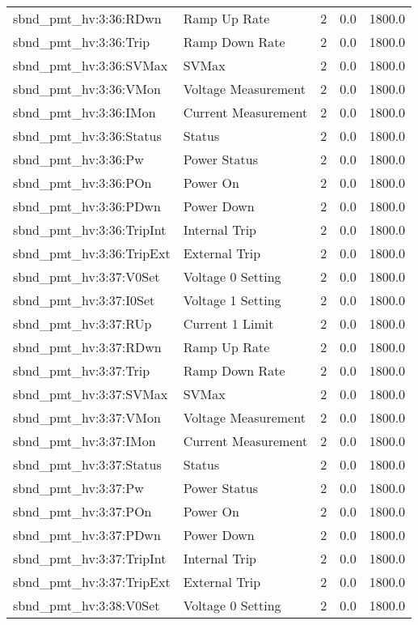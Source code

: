\begin{center}
\begin{longtable}{l | l l l l }
sbnd\_pmt\_hv:3:36:RDwn & Ramp Up Rate & 2 & 0.0 & 1800.0\\ 
sbnd\_pmt\_hv:3:36:Trip & Ramp Down Rate & 2 & 0.0 & 1800.0\\ 
sbnd\_pmt\_hv:3:36:SVMax & SVMax & 2 & 0.0 & 1800.0\\ 
sbnd\_pmt\_hv:3:36:VMon & Voltage Measurement & 2 & 0.0 & 1800.0\\ 
sbnd\_pmt\_hv:3:36:IMon & Current Measurement & 2 & 0.0 & 1800.0\\ 
sbnd\_pmt\_hv:3:36:Status & Status & 2 & 0.0 & 1800.0\\ 
sbnd\_pmt\_hv:3:36:Pw & Power Status & 2 & 0.0 & 1800.0\\ 
sbnd\_pmt\_hv:3:36:POn & Power On & 2 & 0.0 & 1800.0\\ 
sbnd\_pmt\_hv:3:36:PDwn & Power Down & 2 & 0.0 & 1800.0\\ 
sbnd\_pmt\_hv:3:36:TripInt & Internal Trip & 2 & 0.0 & 1800.0\\ 
sbnd\_pmt\_hv:3:36:TripExt & External Trip & 2 & 0.0 & 1800.0\\ 
sbnd\_pmt\_hv:3:37:V0Set & Voltage 0 Setting & 2 & 0.0 & 1800.0\\ 
sbnd\_pmt\_hv:3:37:I0Set & Voltage 1 Setting & 2 & 0.0 & 1800.0\\ 
sbnd\_pmt\_hv:3:37:RUp & Current 1 Limit & 2 & 0.0 & 1800.0\\ 
sbnd\_pmt\_hv:3:37:RDwn & Ramp Up Rate & 2 & 0.0 & 1800.0\\ 
sbnd\_pmt\_hv:3:37:Trip & Ramp Down Rate & 2 & 0.0 & 1800.0\\ 
sbnd\_pmt\_hv:3:37:SVMax & SVMax & 2 & 0.0 & 1800.0\\ 
sbnd\_pmt\_hv:3:37:VMon & Voltage Measurement & 2 & 0.0 & 1800.0\\ 
sbnd\_pmt\_hv:3:37:IMon & Current Measurement & 2 & 0.0 & 1800.0\\ 
sbnd\_pmt\_hv:3:37:Status & Status & 2 & 0.0 & 1800.0\\ 
sbnd\_pmt\_hv:3:37:Pw & Power Status & 2 & 0.0 & 1800.0\\ 
sbnd\_pmt\_hv:3:37:POn & Power On & 2 & 0.0 & 1800.0\\ 
sbnd\_pmt\_hv:3:37:PDwn & Power Down & 2 & 0.0 & 1800.0\\ 
sbnd\_pmt\_hv:3:37:TripInt & Internal Trip & 2 & 0.0 & 1800.0\\ 
sbnd\_pmt\_hv:3:37:TripExt & External Trip & 2 & 0.0 & 1800.0\\ 
sbnd\_pmt\_hv:3:38:V0Set & Voltage 0 Setting & 2 & 0.0 & 1800.0\\ 

\end{longtable}
\end{center}
